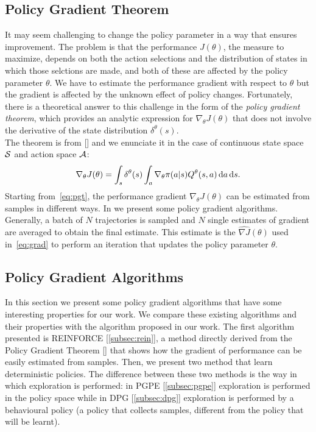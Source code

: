 \subsection{Policy Gradient Theorem} \label{subsec:pgt}
It may seem challenging to change the policy parameter in a way that ensures improvement. The problem is that the performance $J(\theta)$, \ie the measure to maximize, depends on both the action selections and the distribution of states in which those selctions are made, and both of these are affected by the policy parameter $\theta$. We have to estimate the performance gradient with respect to $\theta$ but the gradient is affected by the unknown effect of policy changes. Fortunately, there is a theoretical answer to this challenge in the form of the \emph{policy gradient theorem}, which provides an analytic expression for $\nabla_{\theta}J(\theta)$ that does not involve the derivative of the state distribution $\delta^{\theta}(s)$.\\
\newline
The theorem is from [\citet{Sutton1999PolicyGM}] and we enunciate it in the case of continuous state space $\mathcal{S}$ and action space $\mathcal{A}$:
\begin{align} 
\nabla_{\theta}J(\theta) = \int_s \delta^{\theta}(s) \int_a \nabla_{\theta} \pi(a|s) Q^{\theta}(s,a) \,\mathrm{d} a \,\mathrm{d} s. \label{eq:pgt}
\end{align}
Starting from~\eqref{eq:pgt}, the performance gradient $\nabla_{\theta}J(\theta)$ can be estimated from samples in different ways. In  we present some policy gradient algorithms. Generally, a batch of $N$ trajectories is sampled and $N$ single estimates of gradient are averaged to obtain the final estimate. This estimate is the $\widehat{\nabla J}(\theta)$ used in~\eqref{eq:grad} to perform an iteration that updates the policy parameter $\theta$.

\subsection{Policy Gradient Algorithms} \label{subsec:alg}
In this section we present some policy gradient algorithms that have some interesting properties for our work. We compare these existing algorithms and their properties with the algorithm proposed in our work. The first algorithm presented is REINFORCE [\ref{subsec:rein}], a method directly derived from the Policy Gradient Theorem [] that shows how the gradient of performance can be easily estimated from samples. Then, we present two method that learn deterministic policies. The difference between these two methods is the way in which exploration is performed: in \acf{PGPE} [\ref{subsec:pgpe}] exploration is performed in the policy space while in \acf{DPG} [\ref{subsec:dpg}] exploration is performed by a behavioural policy (\ie a policy that collects samples, different from the policy that will be learnt).

